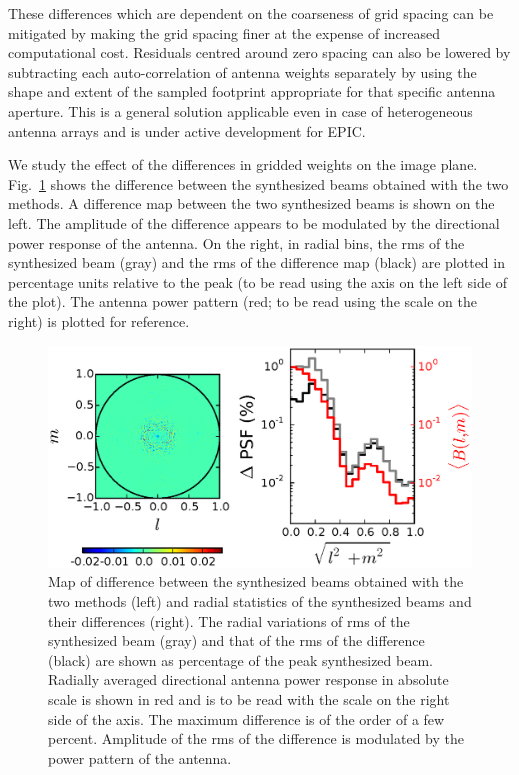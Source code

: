 \documentclass[a4paper,fleqn,usenatbib]{mnras}
\begin{document}
These differences which are dependent on the coarseness of grid spacing can be mitigated by making the grid spacing finer at the expense of increased computational cost. Residuals centred around zero spacing can also be lowered by subtracting each auto-correlation of antenna weights separately by using the shape and extent of the sampled footprint appropriate for that specific antenna aperture. This is a general solution applicable even in case of heterogeneous antenna arrays and is under active development for EPIC.

We study the effect of the differences in gridded weights on the image plane. Fig.~\ref{fig:image-psf-diff} shows the difference between the synthesized beams obtained with the two methods. A difference map between the two synthesized beams is shown on the left. The amplitude of the difference appears to be modulated by the directional power response of the antenna. On the right, in radial bins, the rms of the synthesized beam (gray) and the rms of the difference map (black) are plotted in percentage units relative to the peak (to be read using the axis on the left side of the plot). The antenna power pattern (red; to be read using the scale on the right) is plotted for reference. 

\begin{figure}
  \includegraphics[width=\columnwidth]{figure8}
  \caption{Map of difference between the synthesized beams obtained with the 
    two methods (left) and radial statistics of the synthesized beams and 
    their differences (right). The radial variations of rms of the synthesized 
    beam (gray) and that of the rms of the difference (black) are shown as 
    percentage of the peak synthesized beam. Radially averaged directional 
    antenna power response in absolute scale is shown in red and is to be read 
    with the scale on the right side of the axis. The maximum difference is of 
    the order of a few percent. Amplitude of the rms of the difference is 
    modulated by the power pattern of the antenna.}
  \label{fig:image-psf-diff}
\end{figure}
\end{document}
